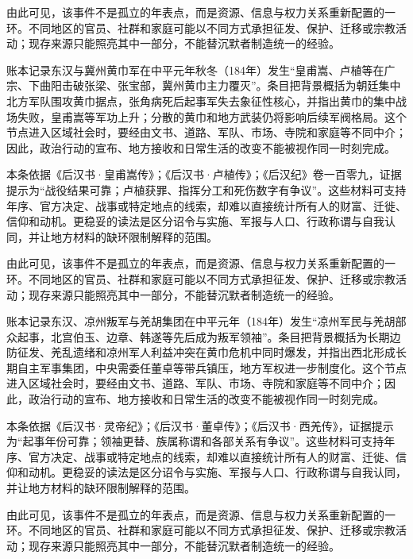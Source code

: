 由此可见，该事件不是孤立的年表点，而是资源、信息与权力关系重新配置的一环。不同地区的官员、社群和家庭可能以不同方式承担征发、保护、迁移或宗教活动；现存来源只能照亮其中一部分，不能替沉默者制造统一的经验。

账本记录东汉与冀州黄巾军在中平元年秋冬（184年）发生“皇甫嵩、卢植等在广宗、下曲阳击破张梁、张宝部，冀州黄巾主力覆灭”。条目把背景概括为朝廷集中北方军队围攻黄巾据点，张角病死后起事军失去象征性核心，并指出黄巾的集中战场失败，皇甫嵩等军功上升；分散的黄巾和地方武装仍将影响后续军阀格局。这个节点进入区域社会时，要经由文书、道路、军队、市场、寺院和家庭等不同中介；因此，政治行动的宣布、地方接收和日常生活的改变不能被视作同一时刻完成。

本条依据《后汉书·皇甫嵩传》；《后汉书·卢植传》；《后汉纪》卷一百零九，证据提示为“战役结果可靠；卢植获罪、指挥分工和死伤数字有争议”。这些材料可支持年序、官方决定、战事或特定地点的线索，却难以直接统计所有人的财富、迁徙、信仰和动机。更稳妥的读法是区分诏令与实施、军报与人口、行政称谓与自我认同，并让地方材料的缺环限制解释的范围。

由此可见，该事件不是孤立的年表点，而是资源、信息与权力关系重新配置的一环。不同地区的官员、社群和家庭可能以不同方式承担征发、保护、迁移或宗教活动；现存来源只能照亮其中一部分，不能替沉默者制造统一的经验。

账本记录东汉、凉州叛军与羌胡集团在中平元年（184年）发生“凉州军民与羌胡部众起事，北宫伯玉、边章、韩遂等先后成为叛军领袖”。条目把背景概括为长期边防征发、羌乱遗绪和凉州军人利益冲突在黄巾危机中同时爆发，并指出西北形成长期自主军事集团，中央需委任董卓等带兵镇压，地方军权进一步制度化。这个节点进入区域社会时，要经由文书、道路、军队、市场、寺院和家庭等不同中介；因此，政治行动的宣布、地方接收和日常生活的改变不能被视作同一时刻完成。

本条依据《后汉书·灵帝纪》；《后汉书·董卓传》；《后汉书·西羌传》，证据提示为“起事年份可靠；领袖更替、族属称谓和各部关系有争议”。这些材料可支持年序、官方决定、战事或特定地点的线索，却难以直接统计所有人的财富、迁徙、信仰和动机。更稳妥的读法是区分诏令与实施、军报与人口、行政称谓与自我认同，并让地方材料的缺环限制解释的范围。

由此可见，该事件不是孤立的年表点，而是资源、信息与权力关系重新配置的一环。不同地区的官员、社群和家庭可能以不同方式承担征发、保护、迁移或宗教活动；现存来源只能照亮其中一部分，不能替沉默者制造统一的经验。

